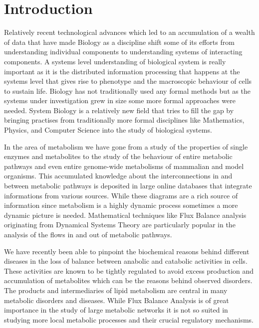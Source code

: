 

\chapter{Introduction}  %

\ifpdf
    \graphicspath{{Chapter1/Figs/Raster/}{Chapter1/Figs/PDF/}{Chapter1/Figs/}}
\else
    \graphicspath{{Chapter1/Figs/Vector/}{Chapter1/Figs/}}
\fi

Relatively recent technological advances which led to an accumulation
of a wealth of data that have made Biology as a
discipline shift some of its efforts from understanding individual
components to understanding systems of interacting components. A
systems level understanding of biological system is really important
as it is the distributed information processing that happens at the
systems level that gives rise to phenotype and the macroscopic
behaviour of cells to sustain life. Biology has not traditionally used
any formal methods but as the systems under investigation grew in size
some more formal approaches were needed. System Biology is a relatively
new field that tries to fill the gap by bringing practises from
traditionally more formal disciplines like Mathematics, Physics, and
Computer Science into the study of biological systems.

In the area of metabolism we have gone from a study of the properties
of single enzymes and metabolites to the study of the behaviour of
entire metabolic pathways and even entire genome-wide metabolisms
of mammalian and model organisms. This accumulated knowledge about the
interconnections in and between metabolic pathways is deposited in
large online databases that integrate informations from various
sources. While these diagrams are a rich source of information
since metabolism is a highly dynamic process sometimes a more dynamic
picture is needed. Mathematical techniques like Flux Balance analysis
originating from Dynamical Systems Theory are particularly popular in
the analysis of the flows in and out of metabolic pathways.

We have recently been able to pinpoint the biochemical reasons behind
different diseases in the loss of balance between anabolic and catabolic
activities in cells. These activities are known to be tightly
regulated to avoid excess production and accumulation of metabolites
which can be the reasons behind observed disorders. The products and
intermediaries of lipid metabolism are central in many metabolic
disorders and diseases. While Flux Balance
Analysis is of great importance in the study of large metabolic
networks it is not so suited in studying more local metabolic
processes and their crucial regulatory mechanisms. 

